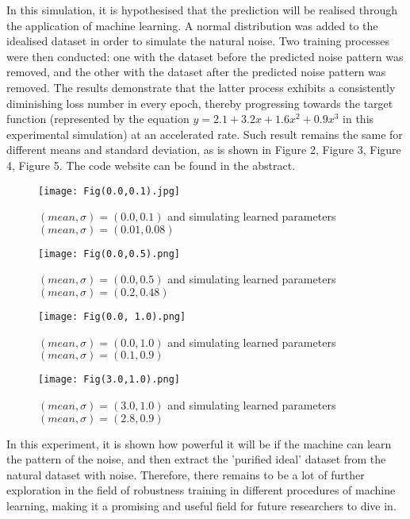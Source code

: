 \documentclass{article}
\begin{document}
In this simulation, it is hypothesised that the prediction will be realised through the application of machine learning. A normal distribution was added to the idealised dataset in order to simulate the natural noise. Two training processes were then conducted: one with the dataset before the predicted noise pattern was removed, and the other with the dataset after the predicted noise pattern was removed. The results demonstrate that the latter process exhibits a consistently diminishing loss number in every epoch, thereby progressing towards the target function (represented by the equation $y = 2.1 + 3.2x + 1.6x^2 + 0.9x^3$ in this experimental simulation) at an accelerated rate. Such result remains the same for different means and standard deviation, as is shown in Figure 2, Figure 3, Figure 4, Figure 5. The code website can be found in the abstract.

\begin{figure}
\centering
\texttt{[image: Fig(0.0,0.1).jpg]}
\caption{\label{figure 2:}$(mean, \sigma) = (0.0, 0.1)$ and simulating learned parameters $(mean, \sigma) = (0.01, 0.08)$}
\end{figure}

\begin{figure}
\centering
\texttt{[image: Fig(0.0,0.5).png]}
\caption{\label{figure 3:}$(mean, \sigma) = (0.0, 0.5)$ and simulating learned parameters $(mean, \sigma) = (0.2, 0.48)$}
\end{figure}

\begin{figure}
\centering
\texttt{[image: Fig(0.0, 1.0).png]}
\caption{\label{figure 4:}$(mean, \sigma) = (0.0, 1.0)$ and simulating learned parameters $(mean, \sigma) = (0.1, 0.9)$}
\end{figure}

\begin{figure}
\centering
\texttt{[image: Fig(3.0,1.0).png]}
\caption{\label{figure 5:}$(mean, \sigma) = (3.0, 1.0)$ and simulating learned parameters $(mean, \sigma) = (2.8, 0.9)$}
\end{figure}
In this experiment, it is shown how powerful it will be if the machine can learn the pattern of the noise, and then extract the 'purified ideal' dataset from the natural dataset with noise. Therefore, there remains to be a lot of further exploration in the field of robustness training in different procedures of machine learning, making it a promising and useful field for future researchers to dive in.
\end{document}
